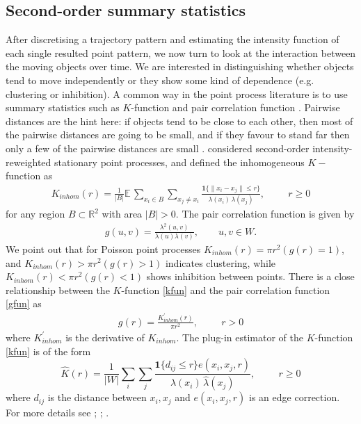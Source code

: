 \documentclass[article]{jss}
\newcommand{\R}{\mathbb{R}}
\newcommand{\ee}{\mathbb{E}}
\begin{document}
\subsection{Second-order summary statistics}
  After discretising a trajectory pattern and estimating the intensity function of each single resulted point pattern, we now turn to look at the interaction between the moving objects over time. We are interested in distinguishing whether objects tend to move independently or they show some kind of dependence (e.g. clustering or inhibition). A common way in the point process literature is to use summary statistics such as $K$-function and pair correlation function \citep{ripley77,baddeley00}. Pairwise distances are the hint here: if objects tend to be close to each other, then most of the pairwise distances are going to be small, and if they favour to stand far then only a few of the pairwise distances are small \citep{BRT15}.  \cite{baddeley00} considered second-order intensity-reweighted stationary point processes, and defined the inhomogeneous $K-$function as
  \begin{eqnarray}\label{kfun}
  K_{inhom}(r) =
  \frac{1}{|B|} \ee \,
  \sum_{x_i \in B} \sum_{x_j \neq x_i} 
  \frac{\textbf{1} \{ \|x_i - x_j\| \le r \} }{ \lambda(x_i) \, \lambda(x_j)}, \hspace{1cm} r \geq 0
  \end{eqnarray}
  for any region $B \subset \R^2$ with area $|B| > 0$. The pair correlation function is given by
  \begin{eqnarray}\label{gfun}
  g(u,v)=\frac{\lambda^2(u,v)}{\lambda(u) \lambda(v)}, \qquad u,v \in W.
  \end{eqnarray}
  We point out that for Poisson point processes $K_{inhom}(r)=\pi r^2 (g(r)=1)$, and $K_{inhom}(r)>\pi r^2 (g(r)>1)$ indicates clustering, while $K_{inhom}(r)<\pi r^2 (g(r)<1)$ shows inhibition between points. There is a close relationship between the $K$-function \eqref{kfun} and the pair correlation function \eqref{gfun} as 
  \begin{eqnarray*}
  g(r)=\frac{K^{'}_{inhom}(r)}{\pi r^2}, \hspace{1cm} r>0
\end{eqnarray*}
where $K^{'}_{inhom}$ is the derivative of $K_{inhom}$.
  The plug-in estimator of the $K$-function \eqref{kfun} is of the form
  \begin{equation}\label{e:hatKinhom:plugin}
  \widehat{K}(r) =
  \frac{1}{|W|}\sum_i \sum_j 
  \frac{\textbf{1}\{d_{ij} \le r\} e(x_i,x_j,r)}{\widehat\lambda(x_i) \, \widehat\lambda(x_j)}, \hspace{1cm} r \geq 0
  \end{equation}
  where $d_{ij}$ is the distance between $x_i,x_j$ and $e(x_i,x_j,r)$ is an edge correction. For more details see \cite[Chapter 4]{MW03}; \cite{IPSS08,D13}; \citep[Chapter7]{BRT15}.
\end{document}
